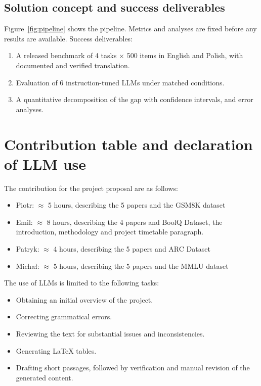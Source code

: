 \documentclass[11pt]{article}
\begin{document}
\subsection*{Solution concept and success deliverables}
Figure~\ref{fig:pipeline} shows the pipeline. Metrics and analyses are fixed
before any results are available.
Success deliverables:
\begin{enumerate}
\item A released benchmark of 4 tasks $\times$ 500 items in English and Polish, with documented and verified translation.
\item Evaluation of 6 instruction-tuned LLMs under matched conditions.
\item A quantitative decomposition of the gap with confidence intervals, and error analyses.
\end{enumerate}

\section{Contribution table and declaration of LLM use}
The contribution for the project proposal are as follows:
\begin{itemize}
\item Piotr: $\approx$ 5 hours, describing the 5 papers and the GSM8K dataset
\item Emil: $\approx$ 8 hours, describing the 4 papers and BoolQ Dataset, the introduction, methodology and project timetable paragraph.
\item Patryk: $\approx$ 4 hours, describing the 5 papers  and ARC Dataset
\item Michał: $\approx$ 5 hours, describing the 5 papers and the MMLU dataset
\end{itemize}

The use of LLMs is limited to the following tasks:
\begin{itemize}
    \item Obtaining an initial overview of the project.
    \item Correcting grammatical errors.
    \item Reviewing the text for substantial issues and inconsistencies.
    \item Generating LaTeX tables.
    \item Drafting short passages, followed by verification and manual revision of the generated content.
\end{itemize}



\end{document}
